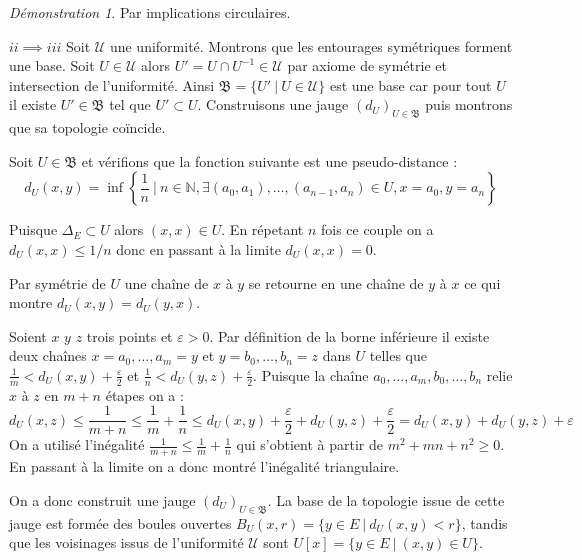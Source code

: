 \documentclass[a4paper, 11pt, french]{book}
\newenvironment{itemise}{\itemize}{\enditemize}
\theoremstyle{plain} %
\theoremstyle{definition} %
\theoremstyle{remark} %
\newtheorem*{demonstration}{Démonstration}
\newcommand{\1}{\mathds{1}}
\newcommand{\inv}[1]{#1^{-1}}
\newcommand{\N}{\mathbb{N}}
\renewcommand{\frak}[1]{\mathfrak{#1}}
\newcommand{\scr}[1]{\mathscr{#1}}
\newcommand\ens[2]{\{#1 \ |\ #2\}}
\begin{document}
\begin{demonstration}
	Par implications circulaires.
	\begin{itemise}
		\item[$ii\implies iii$] Soit $\scr{U}$ une uniformité.
		Montrons que les entourages symétriques forment une base.
		Soit $U\in\scr{U}$ alors $U'=U\cap\inv{U}\in\scr{U}$ par axiome de symétrie et intersection de l'uniformité.
		Ainsi $\frak{B}=\ens{U'}{U\in\scr{U}}$ est une base car pour tout $U$ il existe $U'\in\frak{B}$ tel que $U'\subset U$.
		Construisons une jauge $(d_U)_{U\in\frak{B}}$ puis montrons que sa topologie coïncide. %
		\begin{itemise}
			\item Soit $U\in\frak{B}$ et vérifions que la fonction suivante est une pseudo-distance :
			$$
			d_U(x, y)=\inf\left\{\frac{1}{n}\ \Big|\ n\in\N, \exists (a_0, a_1), \dots, (a_{n-1}, a_n)\in U, x=a_0, y=a_n\right\}
			$$
			\begin{itemise}
				\item Puisque $\Delta_E\subset U$ alors $(x, x)\in U$.
				En répetant $n$ fois ce couple on a $d_U(x, x)\leqslant 1/n$ donc en passant à la limite $d_U(x, x)=0$.
				\item Par symétrie de $U$ une chaîne de $x$ à $y$ se retourne en une chaîne de $y$ à $x$ ce qui montre $d_U(x, y)=d_U(y, x)$.
				\item Soient $x$ $y$ $z$ trois points et $\varepsilon>0$.
				Par définition de la borne inférieure il existe deux chaînes $x=a_0, \dots, a_m=y$ et $y=b_0, \dots, b_n=z$ dans $U$ telles que $\frac{1}{m}<d_U(x, y)+\frac{\varepsilon}{2}$ et $\frac{1}{n}<d_U(y, z)+\frac{\varepsilon}{2}$.
				Puisque la chaîne $a_0, \dots, a_m, b_0, \dots, b_n$ relie $x$ à $z$ en $m+n$ étapes on a :
				$$
				d_U(x, z)
				\leqslant\frac{1}{m+n}
				\leqslant\frac{1}{m}+\frac{1}{n}
				\leqslant d_U(x, y)+\frac{\varepsilon}{2} + d_U(y, z)+\frac{\varepsilon}{2}
				= d_U(x, y) + d_U(y, z) + \varepsilon
				$$
				On a utilisé l'inégalité $\frac{1}{m+n}\leqslant\frac{1}{m}+\frac{1}{n}$ qui s'obtient à partir de $m^2+mn+n^2\geqslant 0$.
				En passant à la limite on a donc montré l'inégalité triangulaire.
			\end{itemise}
			\item On a donc construit une jauge $(d_U)_{U\in\frak{B}}$.
			La base de la topologie issue de cette jauge est formée des boules ouvertes $B_U(x, r)=\ens{y\in E}{d_U(x, y)<r}$, tandis que les voisinages issus de l'uniformité $\scr{U}$ sont $U[x]=\ens{y\in E}{(x, y)\in U}$.

\end{itemise}
\end{itemise}
\end{demonstration}
\end{document}
